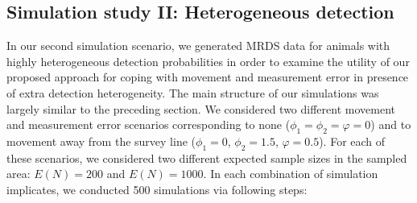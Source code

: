\documentclass[12pt,fleqn]{article}
\begin{document}
\subsection{Simulation study II: Heterogeneous detection}

In our second simulation scenario, we generated MRDS data for animals with highly heterogeneous detection probabilities in order to examine the utility of our proposed approach for coping with movement and measurement error in presence of extra detection heterogeneity.  The main structure of our simulations was largely similar to the preceding section.  We considered two different movement and measurement error scenarios corresponding to none ($\phi_1=\phi_2=\varphi=0$) and to movement away from the survey line ($\phi_1=0$, $\phi_2=1.5$, $\varphi=0.5$). For each of these scenarios, we considered two different expected sample sizes in the sampled area: $E(N) = 200$ and $E(N)=1000$.  In each combination of simulation implicates, we conducted 500 simulations via following steps:
\end{document}
